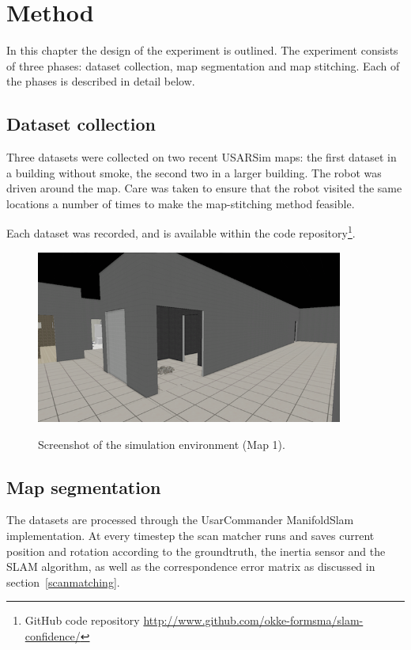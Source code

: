 \chapter{Method}
\label{method}

In this chapter the design of the experiment is outlined. The experiment consists of three phases: dataset collection, map segmentation and map stitching. Each of the phases is described in detail below.

\section{Dataset collection}
Three datasets were collected on two recent USARSim maps: the first dataset in a building without smoke, the second two in a larger building. The robot was driven around the map. Care was taken to ensure that the robot visited the same locations a number of times to make the map-stitching method feasible.

Each dataset was recorded, and is available within the code repository\footnote{GitHub code repository \url{http://www.github.com/okke-formsma/slam-confidence/}}.

\begin{figure}[h]
	\centering
	\includegraphics[width=0.9\textwidth]{images/experiment/map1/screenshot.png}
	\label{fig:map1}
	\caption{Screenshot of the simulation environment (Map 1).}
\end{figure}

\section{Map segmentation}
The datasets are processed through the UsarCommander ManifoldSlam implementation. At every timestep the scan matcher runs and saves current position and rotation according to the groundtruth, the inertia sensor and the SLAM algorithm, as well as the correspondence error matrix as discussed in section~\ref{scanmatching}.

